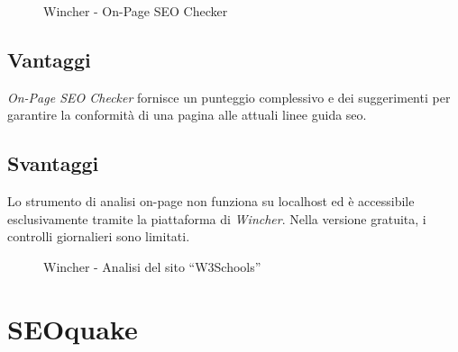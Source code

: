 \begin{figure}[H]
    \centering 
    \caption{Wincher - On-Page SEO Checker}
\end{figure}

\subsection{Vantaggi}
\par \textit{On-Page SEO Checker} fornisce un punteggio complessivo e dei suggerimenti per garantire la conformità di una pagina alle attuali linee guida \gls{seo}.

\subsection{Svantaggi}
\par Lo strumento di analisi \gls{on-page} non funziona su \gls{localhost} ed è accessibile esclusivamente tramite la piattaforma di \textit{Wincher}. Nella versione gratuita, i controlli giornalieri sono limitati.

\begin{figure}[H]
    \centering 
    \caption{Wincher - Analisi del sito “W3Schools”}
\end{figure}

\section{SEOquake}

